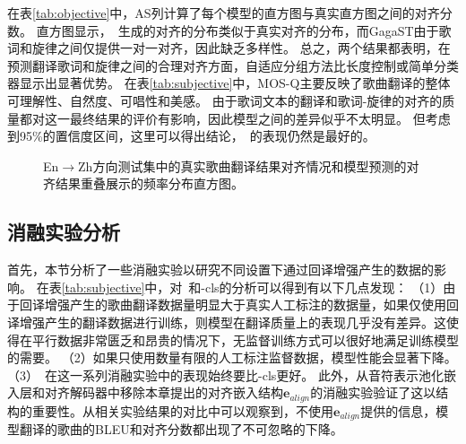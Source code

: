 在表\ref{tab:objective}中，AS列计算了每个模型的直方图与真实直方图之间的对齐分数。
直方图显示，\modelname~生成的对齐的分布类似于真实对齐的分布，而GagaST由于歌词和旋律之间仅提供一对一对齐，因此缺乏多样性。
总之，两个结果都表明，在预测翻译歌词和旋律之间的合理对齐方面，自适应分组方法比长度控制或简单分类器显示出显著优势。
在表\ref{tab:subjective}中，MOS-Q主要反映了歌曲翻译的整体可理解性、自然度、可唱性和美感。
由于歌词文本的翻译和歌词-旋律的对齐的质量都对这一最终结果的评价有影响，因此模型之间的差异似乎不太明显。
但考虑到95\%的置信度区间，这里可以得出结论，\modelname~的表现仍然是最好的。

\begin{figure}[t]
    \centering
\caption{En$\rightarrow$Zh方向测试集中的真实歌曲翻译结果对齐情况和模型预测的对齐结果重叠展示的频率分布直方图。}
\label{fig:align_hist}
\end{figure}

\subsection{消融实验分析}
首先，本节分析了一些消融实验以研究不同设置下通过回译增强产生的数据的影响。
在表\ref{tab:subjective}中，对\modelname~和\modelname-cls的分析可以得到有以下几点发现：
（1）由于回译增强产生的歌曲翻译数据量明显大于真实人工标注的数据量，如果仅使用回译增强产生的翻译数据进行训练，则模型在翻译质量上的表现几乎没有差异。这使得在平行数据非常匮乏和昂贵的情况下，无监督训练方式可以很好地满足训练模型的需要。
（2）如果只使用数量有限的人工标注监督数据，模型性能会显著下降。
（3）\modelname~在这一系列消融实验中的表现始终要比\modelname-cls更好。
此外，从音符表示池化嵌入层和对齐解码器中移除本章提出的对齐嵌入结构$\mathbf{e}_{align}$的消融实验验证了这以结构的重要性。从相关实验结果的对比中可以观察到，不使用$\mathbf{e}_{align}$提供的信息，模型翻译的歌曲的BLEU和对齐分数都出现了不可忽略的下降。

